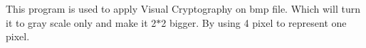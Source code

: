 This program is used to apply Visual Cryptography on bmp file. Which will turn it to gray scale only and make it 2$\ast$2 bigger. By using 4 pixel to represent one pixel. 